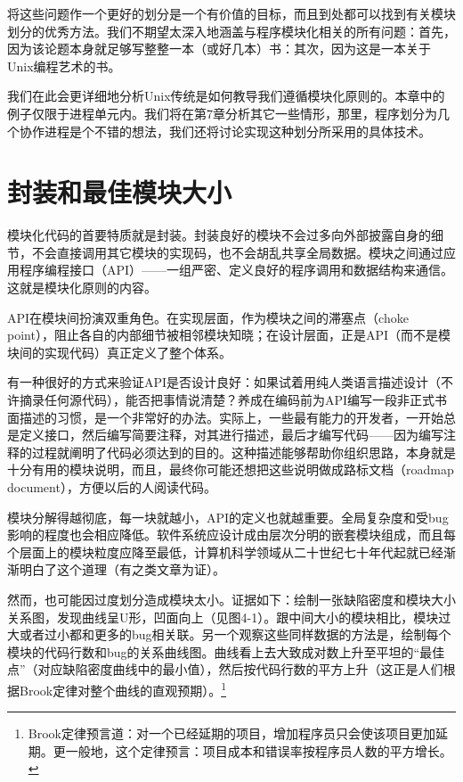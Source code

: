 \documentclass[12pt,oneside]{book}
\begin{document}
将这些问题作一个更好的划分是一个有价值的目标，而且到处都可以找到有关模块划分的优秀方法。我们不期望太深入地涵盖与程序模块化相关的所有问题：首先，因为该论题本身就足够写整整一本（或好几本）书：其次，因为这是一本关于Unix编程艺术的书。

我们在此会更详细地分析Unix传统是如何教导我们遵循模块化原则的。本章中的例子仅限于进程单元内。我们将在第7章分析其它一些情形，那里，程序划分为几个协作进程是个不错的想法，我们还将讨论实现这种划分所采用的具体技术。


\section{封装和最佳模块大小}
模块化代码的首要特质就是封装。封装良好的模块不会过多向外部披露自身的细节，不会直接调用其它模块的实现码，也不会胡乱共享全局数据。模块之间通过应用程序编程接口（API）——一组严密、定义良好的程序调用和数据结构来通信。这就是模块化原则的内容。

API在模块间扮演双重角色。在实现层面，作为模块之间的滞塞点（choke point），阻止各自的内部细节被相邻模块知晓；在设计层面，正是API（而不是模块间的实现代码）真正定义了整个体系。

有一种很好的方式来验证API是否设计良好：如果试着用纯人类语言描述设计（不许摘录任何源代码），能否把事情说清楚？养成在编码前为API编写一段非正式书面描述的习惯，是一个非常好的办法。实际上，一些最有能力的开发者，一开始总是定义接口，然后编写简要注释，对其进行描述，最后才编写代码——因为编写注释的过程就阐明了代码必须达到的目的。这种描述能够帮助你组织思路，本身就是十分有用的模块说明，而且，最终你可能还想把这些说明做成路标文档（roadmap document），方便以后的人阅读代码。

模块分解得越彻底，每一块就越小，API的定义也就越重要。全局复杂度和受bug影响的程度也会相应降低。软件系统应设计成由层次分明的嵌套模块组成，而且每个层面上的模块粒度应降至最低，计算机科学领域从二十世纪七十年代起就已经渐渐明白了这个道理（有\cite{Parnas}之类文章为证）。

然而，也可能因过度划分造成模块太小。证据\cite{Hatton97}如下：绘制一张缺陷密度和模块大小关系图，发现曲线呈U形，凹面向上（见图4-1）。跟中间大小的模块相比，模块过大或者过小都和更多的bug相关联。另一个观察这些同样数据的方法是，绘制每个模块的代码行数和bug的关系曲线图。曲线看上去大致成对数上升至平坦的“最佳点”（对应缺陷密度曲线中的最小值），然后按代码行数的平方上升（这正是人们根据Brook定律对整个曲线的直观预期）。\footnote{ Brook定律预言道：对一个已经延期的项目，增加程序员只会使该项目更加延期。更一般地，这个定律预言：项目成本和错误率按程序员人数的平方增长。}
\end{document}
